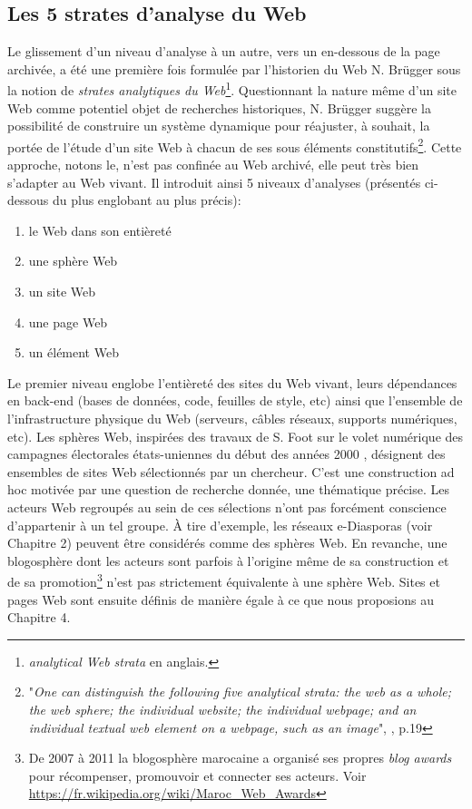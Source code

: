 \documentclass{tufte-book}
\begin{document}
\subsection{Les 5 strates d'analyse du Web}

\par\noindent Le glissement d'un niveau d'analyse à un autre, vers un en-dessous de la page archivée, a été une première fois formulée par l'historien du Web N. Brügger \citep{brugger_website_2009} sous la notion de \textit{strates analytiques du Web}\footnote{\textit{analytical Web strata} en anglais.}. Questionnant la nature même d'un site Web comme potentiel objet de recherches historiques, N. Brügger suggère la possibilité de construire un système dynamique pour réajuster, à souhait, la portée de l'étude d'un site Web à chacun de ses sous éléments constitutifs\footnote{"\textit{One can distinguish the following five analytical strata: the web as a whole; the web sphere; the individual website; the individual webpage; and an individual textual web element on a webpage, such as an image}", \citep{brugger_website_2009}, p.19}. Cette approche, notons le, n'est pas confinée au Web archivé, elle peut très bien s'adapter au Web vivant. Il introduit ainsi 5 niveaux d'analyses (présentés ci-dessous du plus englobant au plus précis):

\begin{enumerate}
\setlength\itemsep{0em}
\item le Web dans son entièreté 
\item une sphère Web
\item un site Web
\item une page Web
\item un élément Web
\end{enumerate} 

\par\noindent Le premier niveau englobe l'entièreté des sites du Web vivant, leurs dépendances en back-end (bases de données, code, feuilles de style, etc) ainsi que l'ensemble de l'infrastructure physique du Web (serveurs, câbles réseaux, supports numériques, etc). Les sphères Web, inspirées des travaux de S. Foot sur le volet numérique des campagnes électorales états-uniennes du début des années 2000 \citep{foot_web_2006}, désignent des ensembles de sites Web sélectionnés par un chercheur. C'est une construction ad hoc motivée par une question de recherche donnée, une thématique précise. Les acteurs Web regroupés au sein de ces sélections n'ont pas forcément conscience d'appartenir à un tel groupe. À tire d'exemple, les réseaux e-Diasporas (voir Chapitre 2) peuvent être considérés comme des sphères Web. En revanche, une blogosphère dont les acteurs sont parfois à l'origine même de sa construction et de sa promotion\footnote{De 2007 à 2011 la blogosphère marocaine a organisé ses propres \textit{blog awards} pour récompenser, promouvoir et connecter ses acteurs. Voir \url{https://fr.wikipedia.org/wiki/Maroc_Web_Awards}} n'est pas strictement équivalente à une sphère Web. Sites et pages Web sont ensuite définis de manière égale à ce que nous proposions au Chapitre 4.
\end{document}
